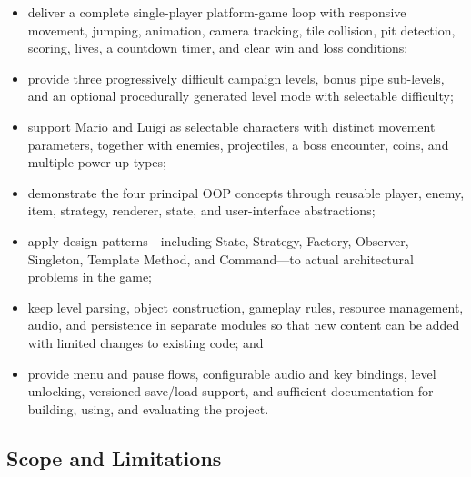 \documentclass{template}
\begin{document}
\begin{itemize}
    \item deliver a complete single-player platform-game loop with responsive
          movement, jumping, animation, camera tracking, tile collision, pit
          detection, scoring, lives, a countdown timer, and clear win and loss
          conditions;
    \item provide three progressively difficult campaign levels, bonus pipe
          sub-levels, and an optional procedurally generated level mode with
          selectable difficulty;
    \item support Mario and Luigi as selectable characters with distinct
          movement parameters, together with enemies, projectiles, a boss
          encounter, coins, and multiple power-up types;
    \item demonstrate the four principal OOP concepts through reusable player,
          enemy, item, strategy, renderer, state, and user-interface
          abstractions;
    \item apply design patterns---including State, Strategy, Factory,
          Observer, Singleton, Template Method, and Command---to actual
          architectural problems in the game;
    \item keep level parsing, object construction, gameplay rules, resource
          management, audio, and persistence in separate modules so that new
          content can be added with limited changes to existing code; and
    \item provide menu and pause flows, configurable audio and key bindings,
          level unlocking, versioned save/load support, and sufficient
          documentation for building, using, and evaluating the project.
\end{itemize}

\subsection{Scope and Limitations}
\end{document}
